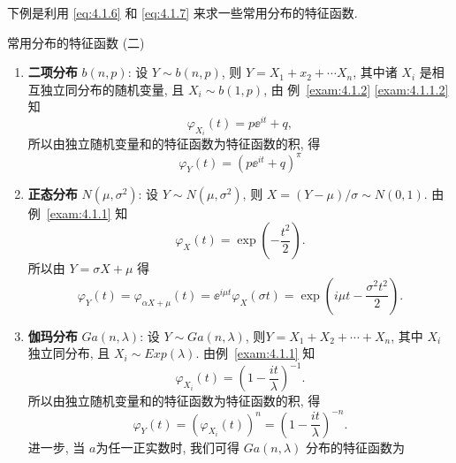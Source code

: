 下例是利用 \eqref{eq:4.1.6} 和 \eqref{eq:4.1.7} 来求一些常用分布的特征函数.


\begin{example}\label{exam:4.1.2}
    常用分布的特征函数 (二)

    \begin{enumerate}
        \item
        \textbf{二项分布} $ b (n, p) $: 设 $ Y \sim b (n, p) $, 则 $ Y = X_1 + x_2 + \dotsb X_n $, 其中诸 $ X_i $ 是相互独立同分布的随机变量, 且 $ X_{i} \sim b (1, p) $, 由 例~\ref{exam:4.1.2} \ref{exam:4.1.1.2} 知
        \begin{equation*}
            \varphi_{X_i} (t) = p \ee^{it} + q,
        \end{equation*}
        所以由独立随机变量和的特征函数为特征函数的积, 得
        \begin{equation*}
            \varphi_Y (t) = \left( p \ee^{it} + q \right)^{\pi}
        \end{equation*}
        \item
        \textbf{正态分布} $ N (\mu, \sigma^2) $: 设 $ Y \sim N (\mu, \sigma^2) $, 则 $ X = (Y - \mu) / \sigma \sim N (0, 1) $.
        由例~\ref{exam:4.1.1} 知
        \begin{equation*}
            \varphi_{X} (t) = \exp \left( -\frac{t^2}{2} \right).
        \end{equation*}
        所以由 $ Y = \sigma X + \mu $ 得
        \begin{equation*}
            \varphi_Y (t) = \varphi_{\alpha X + \mu} (t) =\ee^{i \mu t} \varphi_X ( \sigma t ) = \exp \left( i \mu t - \frac{\sigma^2 t^2}{2} \right).
        \end{equation*}
        \item 
        \textbf{伽玛分布} $ Ga ( n, \lambda ) $: 设 $ Y \sim Ga ( n, \lambda ) $, 则$ Y = X_1 + X_2 + \dotsb + X_n $, 其中 $ X_i $ 独立同分布, 且 $ X_i \sim Exp ( \lambda ) $.
        由例~\ref{exam:4.1.1} 知
        \begin{equation*}
            \varphi_{X_i} (t) = \left( 1 - \frac{it}{\lambda} \right)^{-1}.
        \end{equation*}
        所以由独立随机变量和的特征函数为特征函数的积, 得
        \begin{equation*}
            \varphi_Y (t) = \left( \varphi_{X_i} (t) \right)^n = \left( 1 - \frac{it}{\lambda} \right)^{-n}.
        \end{equation*}
        进一步, 当 $ a $为任一正实数时, 我们可得 $ Ga ( n, \lambda ) $ 分布的特征函数为

\end{enumerate}
\end{example}
